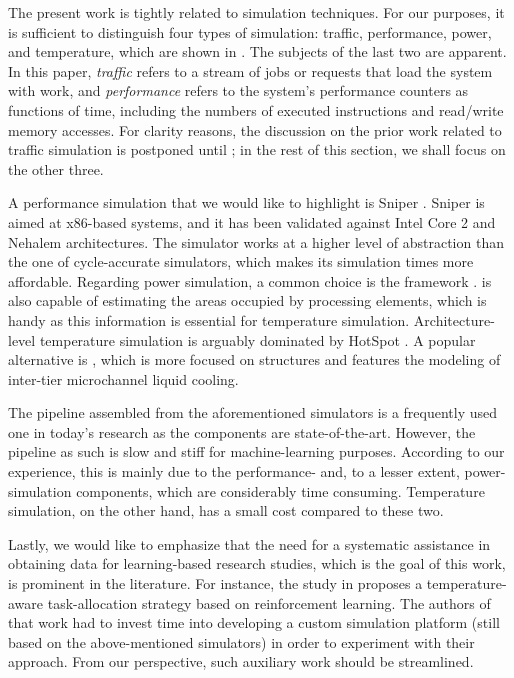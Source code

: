 The present work is tightly related to simulation techniques. For our purposes,
it is sufficient to distinguish four types of simulation: traffic, performance,
power, and temperature, which are shown in . The subjects of
the last two are apparent. In this paper, \emph{traffic} refers to a stream of
jobs or requests that load the system with work, and \emph{performance} refers
to the system's performance counters as functions of time, including the numbers
of executed instructions and read/write memory accesses. For clarity reasons,
the discussion on the prior work related to traffic simulation is postponed
until ; in the rest of this section, we shall focus on the other
three.

A performance simulation that we would like to highlight is Sniper
\cite{carlson2011}. Sniper is aimed at x86-based systems, and it has been
validated against Intel Core 2 and Nehalem architectures. The simulator works at
a higher level of abstraction than the one of cycle-accurate simulators, which
makes its simulation times more affordable. Regarding power simulation, a common
choice is the  framework \cite{li2009}.  is also capable of
estimating the areas occupied by processing elements, which is handy as this
information is essential for temperature simulation. Architecture-level
temperature simulation is arguably dominated by HotSpot \cite{skadron2004}. A
popular alternative is  \cite{sridhar2010}, which is more focused on
 structures and features the modeling of inter-tier microchannel liquid
cooling.

The pipeline assembled from the aforementioned simulators is a frequently used
one in today's research as the components are state-of-the-art. However, the
pipeline as such is slow and stiff for machine-learning purposes. According to
our experience, this is mainly due to the performance- and, to a lesser extent,
power-simulation components, which are considerably time consuming. Temperature
simulation, on the other hand, has a small cost compared to these two.

Lastly, we would like to emphasize that the need for a systematic assistance in
obtaining data for learning-based research studies, which is the goal of this
work, is prominent in the literature. For instance, the study in \cite{lu2015}
proposes a temperature-aware task-allocation strategy based on reinforcement
learning. The authors of that work had to invest time into developing a custom
simulation platform (still based on the above-mentioned simulators) in order to
experiment with their approach. From our perspective, such auxiliary work should
be streamlined.
